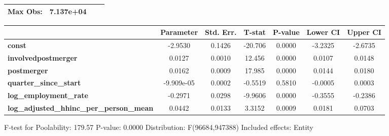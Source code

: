 \documentclass{report}
\begin{document}
\begin{center}
\begin{tabular}{lclc}
\textbf{Max Obs:}                                &      7.137e+04       & \textbf{                     }   &                  \\
\bottomrule
\end{tabular}
\begin{tabular}{lcccccc}
                                                 & \textbf{Parameter} & \textbf{Std. Err.} & \textbf{T-stat} & \textbf{P-value} & \textbf{Lower CI} & \textbf{Upper CI}  \\
\midrule
\textbf{const}                                   &      -2.9530       &       0.1426       &     -20.706     &      0.0000      &      -3.2325      &      -2.6735       \\
\textbf{involvedpostmerger}                      &       0.0127       &       0.0010       &      12.456     &      0.0000      &       0.0107      &       0.0148       \\
\textbf{postmerger}                              &       0.0162       &       0.0009       &      17.985     &      0.0000      &       0.0144      &       0.0180       \\
\textbf{quarter\_since\_start}                   &     -9.909e-05     &       0.0002       &     -0.5519     &      0.5810      &      -0.0005      &       0.0003       \\
\textbf{log\_employment\_rate}                   &      -0.2971       &       0.0298       &     -9.9606     &      0.0000      &      -0.3555      &      -0.2386       \\
\textbf{log\_adjusted\_hhinc\_per\_person\_mean} &       0.0442       &       0.0133       &      3.3152     &      0.0009      &       0.0181      &       0.0703       \\
\bottomrule
\end{tabular}
\end{center}

F-test for Poolability: 179.57 \newline
 P-value: 0.0000 \newline
 Distribution: F(96684,947388) \newline
  \newline
 Included effects: Entity
\end{document}
